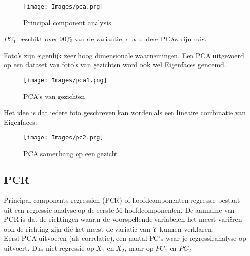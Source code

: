 {\begin{figure}[h]
    \centering
    \texttt{[image: Images/pca.png]}
    \caption{Principal component analysis}
    \label{fig:pca}
\end{figure}
\noindent $PC_1$ beschikt over 90\% van de variantie, dus andere PCAs zijn ruis. 

\noindent Foto’s zijn eigenlijk zeer hoog dimensionale waarnemingen. Een PCA uitgevoerd op een dataset van foto's van gezichten word ook wel Eigenfaces genoemd.\\
\begin{figure}[h]
    \centering
    \texttt{[image: Images/pca1.png]}
    \caption{PCA's van gezichten}
    \label{fig:pca1}
\end{figure}

\noindent Het idee is dat iedere foto geschreven kan worden als een lineaire combinatie van Eigenfaces:
\begin{figure}[h]
    \centering
    \texttt{[image: Images/pc2.png]}
    \caption{PCA samenhang op een gezicht}
    \label{fig:pca2}
\end{figure}

\subsection{PCR}
Principal components regression (PCR) of hoofdcomponenten-regressie bestaat uit een regressie-analyse op de eerste M hoofdcomponenten. De aanname van PCR is dat de richtingen waarin de voorspellende variabelen het meest variëren ook de richting zijn die het meest de variatie van Y kunnen verklaren.\\

\noindent Eerst PCA uitvoeren (als correlatie), een aantal PC's waar je regressieanalyse op uitvoert. Dus niet regressie op $X_1$ en $X_2$, maar op $PC_1$ en $PC_2$.\\

}
